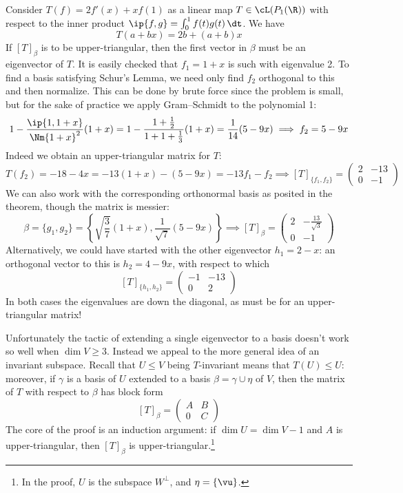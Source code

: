\begin{example}{}{}
Consider $T(f)=2f'(x)+xf(1)$ as a linear map $T\in\cL(P_1(\R))$ with respect to the inner product $\ip{f,g}=\int_0^1f(t)g(t)\,\dt$. We have
\[T(a+bx)=2b+(a+b)x\]
If $[T]_\beta$ is to be upper-triangular, then the first vector in $\beta$ must be an eigenvector of $T$.
It is easily checked that $f_1=1+x$ is such with eigenvalue 2. To find a basis satisfying Schur's Lemma, we need only find $f_2$ orthogonal to this and then normalize. This can be done by brute force since the problem is small, but for the sake of practice we apply Gram--Schmidt to the polynomial 1:
\[1-\frac{\ip{1,1+x}}{\Nm{1+x}^2}(1+x)= 1-\frac{1+\frac 12}{1+1+\frac 13}(1+x)=\frac 1{14}(5-9x) \implies f_2=5-9x\]
Indeed we obtain an upper-triangular matrix for $T$:
\[T(f_2)=-18-4x =-13(1+x)-(5-9x) =-13f_1-f_2\implies [T]_{\{f_1,f_2\}}=\begin{pmatrix}
2&-13\\
0&-1
\end{pmatrix}\]
We can also work with the corresponding orthonormal basis as posited in the theorem, though the matrix is messier:
\[\beta=\{g_1,g_2\}=\left\{\sqrt{\frac 37}(1+x),\frac 1{\sqrt 7}(5-9x)\right\} \implies [T]_\beta=\begin{pmatrix}
2&-\frac{13}{\sqrt 3}\\
0&-1
\end{pmatrix}\]
Alternatively, we could have started with the other eigenvector $h_1=2-x$: an orthogonal vector to this is $h_2=4-9x$, with respect to which
\[[T]_{\{h_1,h_2\}}=\begin{pmatrix}
-1&-13\\
0&2
\end{pmatrix}\]
In both cases the eigenvalues are down the diagonal, as must be for an upper-triangular matrix!
\end{example}\vspace*{10pt}


\parbox{\linewidth}{Unfortunately the tactic of extending a single eigenvector to a basis doesn't work so well when $\dim V\ge 3$. Instead we appeal to the more general idea of an invariant subspace. Recall that $U\le V$ being $T$-invariant means that $T(U)\le U$: moreover, if $\gamma$ is a basis of $U$ extended to a basis $\beta=\gamma\cup\eta$ of $V$, then the matrix of $T$ with respect to $\beta$ has block form
\[[T]_\beta=\left(\begin{array}{c|c}
A&B\\\hline
0&C
\end{array}\right)\]
The core of the proof is an induction argument: if $\dim U=\dim V-1$ and $A$ is upper-triangular, then $[T]_\beta$ is upper-triangular.\footnote{In the proof, $U$ is the subspace $W^\perp$, and $\eta=\{\vu\}$.}}

